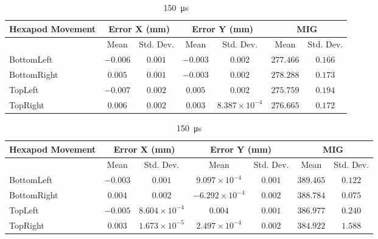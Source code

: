 \begin{table}[h]
    \begin{subtable}{\textwidth}
        \centering
        \footnotesize
        \begin{tabular}{lcccccc}
            \toprule
            Hexapod Movement & \multicolumn{2}{c}{Error X (mm)} & \multicolumn{2}{c}{Error Y (mm)} & \multicolumn{2}{c}{MIG}  \\
            \midrule
            & \multicolumn{1}{c}{Mean} & \multicolumn{1}{c}{Std. Dev.} & \multicolumn{1}{c}{Mean} & \multicolumn{1}{c}{Std. Dev.} & \multicolumn{1}{c}{Mean} & \multicolumn{1}{c}{Std. Dev.} \\
            \midrule
            \textsf{BottomLeft} & $-0.006$ & $0.001$ & $-0.003$ & $0.002$ & $277.466$ & $0.166$ \\
            \textsf{BottomRight} & $0.005$ & $0.001$ & $-0.003$ & $0.002$ & $278.288$ & $0.173$ \\
            \textsf{TopLeft} & $-0.007$ & $0.002$ & $0.005$ & $0.002$ & $275.759$ & $0.194$ \\
            \textsf{TopRight} & $0.006$ & $0.002$ & $0.003$ & $8.387\times10^{-4}$ & $276.665$ & $0.172$ \\
            \bottomrule
        \end{tabular}
        \caption{\SI{80}{\micro\second}}
    \end{subtable}

    \vspace{10pt}

    \begin{subtable}{\textwidth}
        \centering
        \footnotesize
        \begin{tabular}{lcccccc}
            \toprule
            Hexapod Movement & \multicolumn{2}{c}{Error X (mm)} & \multicolumn{2}{c}{Error Y (mm)} & \multicolumn{2}{c}{MIG}  \\
            \midrule
            & \multicolumn{1}{c}{Mean} & \multicolumn{1}{c}{Std. Dev.} & \multicolumn{1}{c}{Mean} & \multicolumn{1}{c}{Std. Dev.} & \multicolumn{1}{c}{Mean} & \multicolumn{1}{c}{Std. Dev.} \\
            \midrule
            \textsf{BottomLeft} & $-0.003$ & $0.001$ & $9.097\times10^{-4}$ & $0.001$ & $389.465$ & $0.122$ \\
            \textsf{BottomRight} & $0.004$ & $0.002$ & $-6.292\times10^{-4}$ & $0.002$ & $388.784$ & $0.075$ \\
            \textsf{TopLeft} & $-0.005$ & $8.604\times10^{-4}$ & $0.004$ & $0.001$ & $386.977$ & $0.240$ \\
            \textsf{TopRight} & $0.003$ & $1.673\times10^{-5}$ & $2.497\times10^{-4}$ & $0.002$ & $384.922$ & $1.588$ \\
            \bottomrule
        \end{tabular}
        \caption{\SI{150}{\micro\second}}
    \end{subtable}


\end{table}
